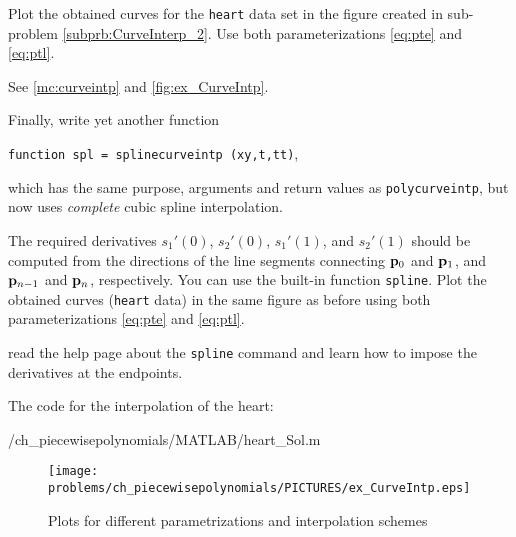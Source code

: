 \begin{problem}
\begin{subproblem}[3]
Plot the obtained curves for the \texttt{heart} data set in the figure created in
sub-problem \ref{subprb:CurveInterp_2}. Use both parameterizations \eqref{eq:pte}
and \eqref{eq:ptl}.

\begin{solution}
See \autoref{mc:curveintp} and \autoref{fig:ex_CurveIntp}.
\end{solution}
\end{subproblem}


\begin{subproblem}[3] \label{subprb:CurveInterp_4}
Finally, write yet another \Matlab{} function 
%
\begin{center}
\texttt{function \quad spl = splinecurveintp (xy,t,tt)},
\end{center}
%
which has the same purpose, arguments and return values as \texttt{polycurveintp}, but
now uses \textit{complete} cubic spline interpolation.

The required derivatives $s_{1}'(0)$, $s_{2}'(0)$, $s_{1}'(1)$, and $s_{2}'(1)$
should be computed from the directions of the line segments connecting ${\mathbf{p}}_{0}$
and ${\mathbf{p}}_{1}$, and ${\mathbf{p}}_{n-1}$ and ${\mathbf{p}}_{n}$, respectively.  You can use the
\Matlab{} built-in function \texttt{spline}.  Plot the obtained curves
(\texttt{heart} data) in the same figure as before using both parameterizations
\eqref{eq:pte} and \eqref{eq:ptl}.

\hint{} read the \Matlab{} help page about the \texttt{spline} command and learn how to impose the derivatives at the endpoints.

\begin{solution}
The code for the interpolation of the heart:

{\problems/ch_piecewisepolynomials/MATLAB/heart_Sol.m}

\begin{figure}[htb]\begin{center}
\texttt{[image: \\problems/ch\_piecewisepolynomials/PICTURES/ex\_CurveIntp.eps]}
\caption{Plots for different parametrizations and interpolation schemes}
\label{fig:ex_CurveIntp}
\end{center}\end{figure}


\end{solution}
\end{subproblem}
\end{problem}
